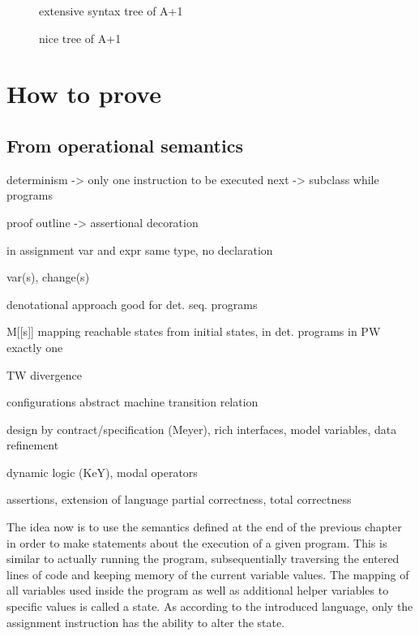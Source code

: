 \begin{figure}
	\begin{center}
		
	\end{center}

	\caption{extensive syntax tree of A+1}
	\label{fig:tree_semanticTree_syntax_A1}
\end{figure}

\begin{figure}
	\begin{center}
		
	\end{center}

	\caption{nice  tree of A+1}
	\label{fig:tree_semanticTree_semantic_A1}
\end{figure}

\chapter{How to prove}

\section{From operational semantics}
determinism -> only one instruction to be executed next -> subclass while programs

proof outline -> assertional decoration

in assignment var and expr same type, no declaration

var(s), change(s)

denotational approach good for det. seq. programs

M[[s]] mapping reachable states from initial states, in det. programs in PW exactly one

TW divergence

configurations abstract machine transition relation

design by contract/specification (Meyer), rich interfaces, model variables, data refinement

dynamic logic (KeY), modal operators

assertions, extension of language
partial correctness, total correctness

The idea now is to use the semantics defined at the end of the previous chapter in order to make statements about the execution of a given program. This is similar to actually running the program, subsequentially traversing the entered lines of code and keeping memory of the current variable values. The mapping of all variables used inside the program as well as additional helper variables to specific values is called a state. As according to the introduced language, only the assignment instruction has the ability to alter the state.

